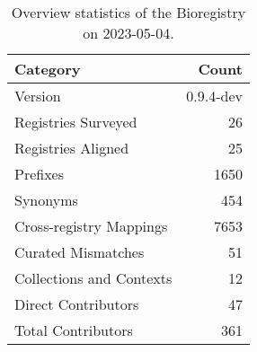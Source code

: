 \begin{table}
\caption{Overview statistics of the Bioregistry on 2023-05-04.}
\label{tab:bioregistry-summary}
\begin{tabular}{lr}
\toprule
Category & Count \\
\midrule
Version & 0.9.4-dev \\
Registries Surveyed & 26 \\
Registries Aligned & 25 \\
Prefixes & 1650 \\
Synonyms & 454 \\
Cross-registry Mappings & 7653 \\
Curated Mismatches & 51 \\
Collections and Contexts & 12 \\
Direct Contributors & 47 \\
Total Contributors & 361 \\
\bottomrule
\end{tabular}
\end{table}
